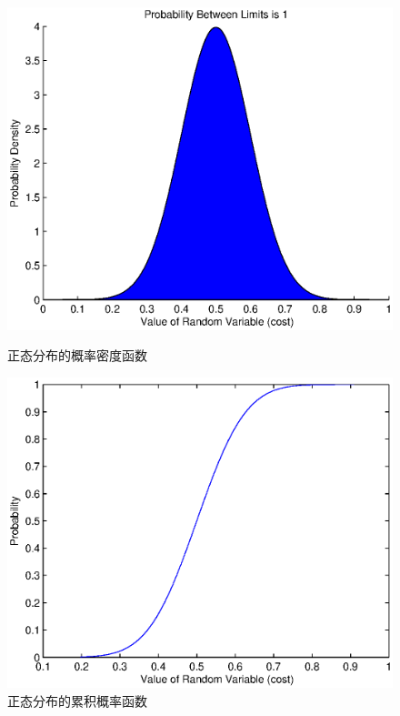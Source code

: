 \begin{figure}[tb] 
  \begin{minipage}[t]{0.5\linewidth} 
    \centering 
    \includegraphics[width = \textwidth]{bayesian_normal_density_scheme.eps} 
    \caption{正态分布的概率密度函数} 
    \label{fig:chap_bayesian:normal_density_scheme} 
  \end{minipage}%
  \begin{minipage}[t]{0.5\linewidth} 
    \centering 
    \includegraphics[width=\textwidth]{bayesian_normal_cdf_scheme.eps} 
    \caption{正态分布的累积概率函数} 
    \label{fig:chap_bayesian:normal_cdf_schem} 
  \end{minipage} 
\end{figure}
